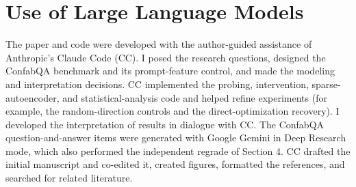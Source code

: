 \section*{Use of Large Language Models}

The paper and code were developed with the author-guided assistance of
Anthropic's Claude Code (CC). I posed the research questions, designed
the ConfabQA benchmark and its prompt-feature control, and made the
modeling and interpretation decisions. CC implemented the probing,
intervention, sparse-autoencoder, and statistical-analysis code and
helped refine experiments (for example, the random-direction controls
and the direct-optimization recovery). I developed the interpretation of
results in dialogue with CC. The ConfabQA question-and-answer items were
generated with Google Gemini in Deep Research mode, which also performed
the independent regrade of Section 4. CC drafted the initial manuscript
and co-edited it, created figures, formatted the references, and
searched for related literature.
